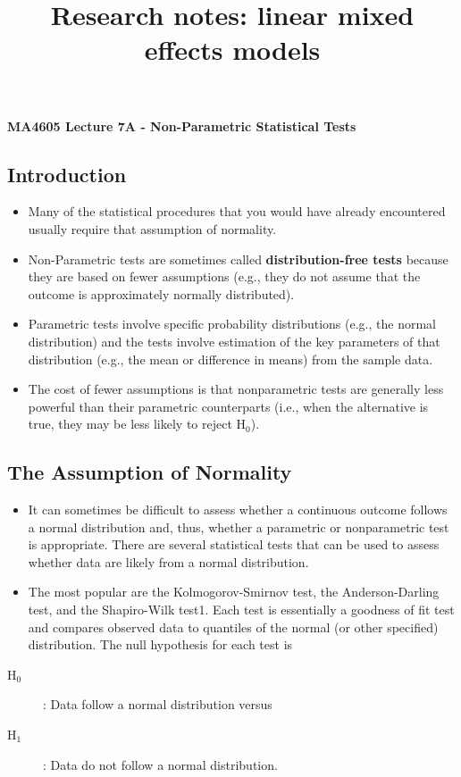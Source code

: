 \documentclass[12pt, a4paper]{report}
\title{Research notes: linear mixed effects models}
\author{ } \date{ }
\theoremstyle{plain}
\theoremstyle{definition}
\theoremstyle{remark}
\begin{document}
\noindent \textbf{MA4605 Lecture 7A - Non-Parametric Statistical Tests}

\subsection*{Introduction}
\begin{itemize}
	\item Many of the statistical procedures that you would have already encountered usually require that assumption of normality.
\item Non-Parametric tests are sometimes called\textbf{ distribution-free tests} because they are based on fewer assumptions (e.g., they do not assume that the outcome is approximately normally distributed). \item Parametric tests involve specific probability distributions (e.g., the normal distribution) and the tests involve estimation of the key parameters of that distribution (e.g., the mean or difference in means) from the sample data. 
\item The cost of fewer assumptions is that nonparametric tests are generally less powerful than their parametric counterparts (i.e., when the alternative is true, they may be less likely to reject H$_0$).
\end{itemize}



\subsection*{The Assumption of Normality}
\begin{itemize}
\item It can sometimes be difficult to assess whether a continuous outcome follows a normal distribution and, thus, whether a parametric or nonparametric test is appropriate. There are several statistical tests that can be used to assess whether data are likely from a normal distribution. 
\item The most popular are the Kolmogorov-Smirnov test, the Anderson-Darling test, and the Shapiro-Wilk test1. Each test is essentially a goodness of fit test and compares observed data to quantiles of the normal (or other specified) distribution. The null hypothesis for each test is
\end{itemize}
\begin{description} 
	\item[H$_0$]: Data follow a normal distribution versus 
	\item[H$_1$]: Data do not follow a normal distribution. 
\end{description}
\end{document}
